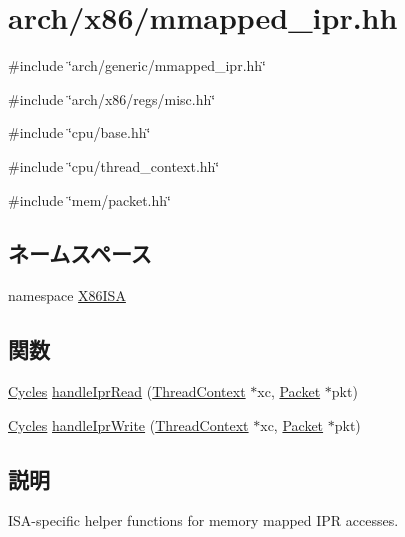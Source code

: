 \hypertarget{x86_2mmapped__ipr_8hh}{
\section{arch/x86/mmapped\_\-ipr.hh}
\label{x86_2mmapped__ipr_8hh}
}
{\ttfamily \#include \char`\"{}arch/generic/mmapped\_\-ipr.hh\char`\"{}}\par
{\ttfamily \#include \char`\"{}arch/x86/regs/misc.hh\char`\"{}}\par
{\ttfamily \#include \char`\"{}cpu/base.hh\char`\"{}}\par
{\ttfamily \#include \char`\"{}cpu/thread\_\-context.hh\char`\"{}}\par
{\ttfamily \#include \char`\"{}mem/packet.hh\char`\"{}}\par
\subsection*{ネームスペース}
\begin{DoxyCompactItemize}
\item 
namespace \hyperlink{namespaceX86ISA}{X86ISA}
\end{DoxyCompactItemize}
\subsection*{関数}
\begin{DoxyCompactItemize}
\item 
\hyperlink{classCycles}{Cycles} \hyperlink{namespaceX86ISA_a23dd7789afdb4f219d0c126238ef8052}{handleIprRead} (\hyperlink{classThreadContext}{ThreadContext} $\ast$xc, \hyperlink{classPacket}{Packet} $\ast$pkt)
\item 
\hyperlink{classCycles}{Cycles} \hyperlink{namespaceX86ISA_aa42813d6b9ccfb0d9d72d0a96d923106}{handleIprWrite} (\hyperlink{classThreadContext}{ThreadContext} $\ast$xc, \hyperlink{classPacket}{Packet} $\ast$pkt)
\end{DoxyCompactItemize}


\subsection{説明}
ISA-\/specific helper functions for memory mapped IPR accesses. 